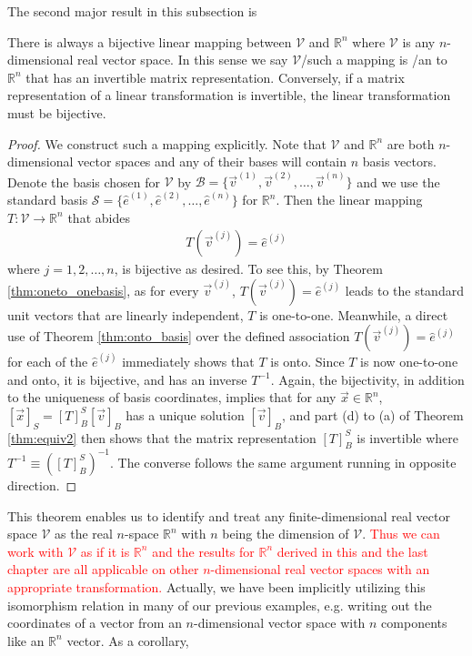 The second major result in this subsection is
\begin{thm}
\label{thm:isomorphism}
There is always a bijective linear mapping between $\mathcal{V}$ and $\mathbb{R}^n$ where $\mathcal{V}$ is any $n$-dimensional real vector space. In this sense we say $\mathcal{V}$/such a mapping is /an  to $\mathbb{R}^n$ that has an invertible matrix representation. Conversely, if a matrix representation of a linear transformation is invertible, the linear transformation must be bijective.
\end{thm}
\begin{proof}
We construct such a mapping explicitly. Note that $\mathcal{V}$ and $\mathbb{R}^n$ are both $n$-dimensional vector spaces and any of their bases will contain $n$ basis vectors. Denote the basis chosen for $\mathcal{V}$ by $\mathcal{B} = \{\vec{v}^{(1)}, \vec{v}^{(2)}, \ldots, \vec{v}^{(n)}\}$ and we use the standard basis $\mathcal{S} = \{\hat{e}^{(1)}, \hat{e}^{(2)}, \ldots, \hat{e}^{(n)}\}$ for $\mathbb{R}^n$. Then the linear mapping $T: \mathcal{V} \to \mathbb{R}^n$ that abides
\begin{align*}
T(\vec{v}^{(j)}) = \hat{e}^{(j)}    
\end{align*}
where $j = 1,2,\ldots,n$, is bijective as desired. To see this, by Theorem \ref{thm:oneto_onebasis}, as for every $\vec{v}^{(j)}$, $T(\vec{v}^{(j)}) = \hat{e}^{(j)}$ leads to the standard unit vectors that are linearly independent, $T$ is one-to-one. Meanwhile, a direct use of Theorem \ref{thm:onto_basis} over the defined association $T(\vec{v}^{(j)}) = \hat{e}^{(j)}$ for each of the $\hat{e}^{(j)}$ immediately shows that $T$ is onto. Since $T$ is now one-to-one and onto, it is bijective, and has an inverse $T^{-1}$. Again, the bijectivity, in addition to the uniqueness of basis coordinates, implies that for any $\vec{x} \in \mathbb{R}^n$, $[\vec{x}]_S = [T]_B^S[\vec{v}]_B$ has a unique solution $[\vec{v}]_B$, and part (d) to (a) of Theorem \ref{thm:equiv2} then shows that the matrix representation $[T]_B^S$ is invertible where $T^{-1} \equiv ([T]_B^S)^{-1}$. The converse follows the same argument running in opposite direction.
\end{proof}
This theorem enables us to identify and treat any finite-dimensional real vector space $\mathcal{V}$ as the real $n$-space $\mathbb{R}^n$ with $n$ being the dimension of $\mathcal{V}$. \textcolor{red}{Thus we can work with $\mathcal{V}$ as if it is $\mathbb{R}^n$ and the results for $\mathbb{R}^n$ derived in this and the last chapter are all applicable on other $n$-dimensional real vector spaces with an appropriate transformation.} Actually, we have been implicitly utilizing this isomorphism relation in many of our previous examples, e.g. writing out the coordinates of a vector from an $n$-dimensional vector space with $n$ components like an $\mathbb{R}^n$ vector. As a corollary,
